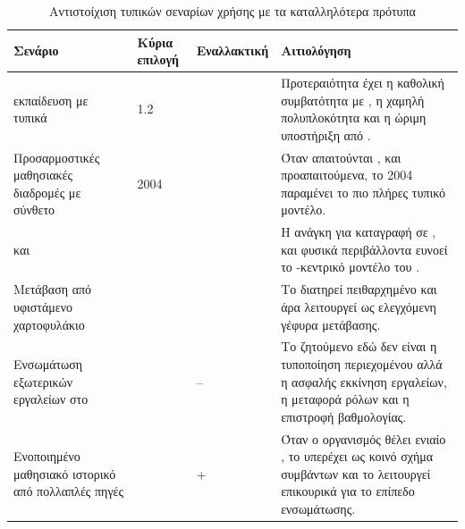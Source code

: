 \begin{table}[H]
\centering
\caption{Αντιστοίχιση τυπικών σεναρίων χρήσης με τα καταλληλότερα πρότυπα}
\label{tab:use_case_mapping}
\small
\setlength{\tabcolsep}{5pt}
\renewcommand{\arraystretch}{1.25}
\begin{chaptertablebox}
\begin{tabularx}{\textwidth}{|p{3.4cm}|p{2.0cm}|p{2.0cm}|Y|}
\hline
\textbf{Σενάριο} & \textbf{Κύρια επιλογή} & \textbf{Εναλλακτική} & \textbf{Αιτιολόγηση} \\
\hline
{} εκπαίδευση με τυπικά  &  1.2 &  & Προτεραιότητα έχει η καθολική συμβατότητα με , η χαμηλή πολυπλοκότητα και η ώριμη υποστήριξη από . \\
\hline
Προσαρμοστικές μαθησιακές διαδρομές με σύνθετο  &  2004 &  & Όταν απαιτούνται ,  και προαπαιτούμενα, το  2004 παραμένει το πιο πλήρες τυπικό μοντέλο. \\
\hline
{} και  &  &  & Η ανάγκη για καταγραφή σε ,  και φυσικά περιβάλλοντα ευνοεί το -κεντρικό μοντέλο του . \\
\hline
Μετάβαση από υφιστάμενο  χαρτοφυλάκιο &  &  & Το  διατηρεί πειθαρχημένο  και άρα λειτουργεί ως ελεγχόμενη γέφυρα μετάβασης. \\
\hline
Ενσωμάτωση εξωτερικών εργαλείων στο  &  & -- & Το ζητούμενο εδώ δεν είναι η τυποποίηση περιεχομένου αλλά η ασφαλής εκκίνηση εργαλείων, η μεταφορά ρόλων και η επιστροφή βαθμολογίας. \\
\hline
Ενοποιημένο μαθησιακό ιστορικό από πολλαπλές πηγές &  &  +  & Όταν ο οργανισμός θέλει ενιαίο , το  υπερέχει ως κοινό σχήμα συμβάντων και το  λειτουργεί επικουρικά για το επίπεδο ενσωμάτωσης. \\
\hline
\end{tabularx}
\end{chaptertablebox}
\end{table}
